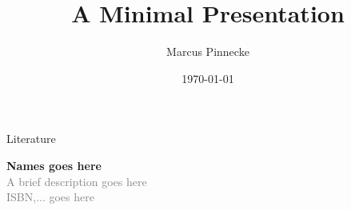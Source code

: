 \documentclass{beamer}
\title{A Minimal Presentation}
\date{\today}
\author{Marcus Pinnecke}
\institute{Metrocity Theme Headquarter}
\begin{document}
  \begin{frame}[t]{Literature}
   \begin{spacing}{1.0}
    {\textbf{Names goes here}}\\\textcolor{gray}{{\small A brief description goes here}\\{\small  ISBN,... goes here}}
    \end{spacing}
  \end{frame}
\end{document}
